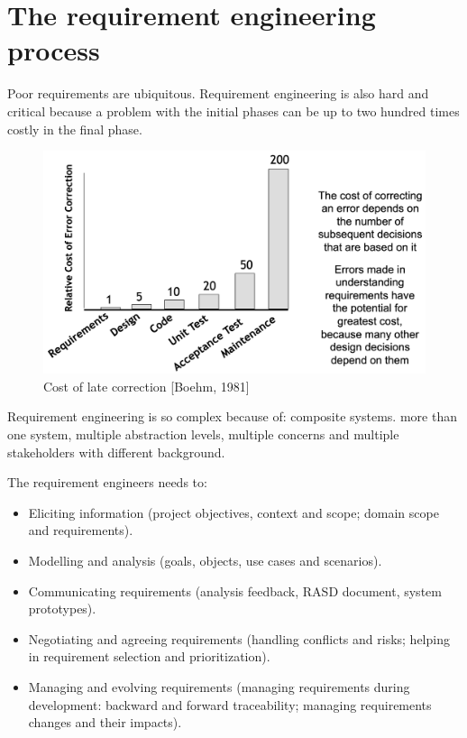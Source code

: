 \documentclass[12pt, a4paper]{report}
\theoremstyle{remark}
\begin{document}
\section{The requirement engineering process}
    Poor requirements are ubiquitous. Requirement engineering is also hard and critical because a problem with the initial phases can be up to two hundred times costly in the final phase. 
    \begin{figure}
        \centering
        \includegraphics[width=1\linewidth]{images/requirements.png}
        \caption{Cost of late correction [Boehm, 1981]}
    \end{figure}
    Requirement engineering is so complex because of: composite systems. more than one system, multiple abstraction levels, multiple concerns and multiple stakeholders with different background.
    \par
    The requirement engineers needs to: 
    \begin{itemize}
        \item Eliciting information (project objectives, context and scope; domain scope and requirements).
        \item Modelling and analysis (goals, objects, use cases and scenarios).
        \item Communicating requirements (analysis feedback, RASD document, system prototypes).
        \item Negotiating and agreeing requirements (handling conflicts and risks; helping in requirement selection and prioritization).
        \item Managing and evolving requirements (managing requirements during development: backward and forward traceability; managing requirements changes and their impacts).
    \end{itemize}
\end{document}
